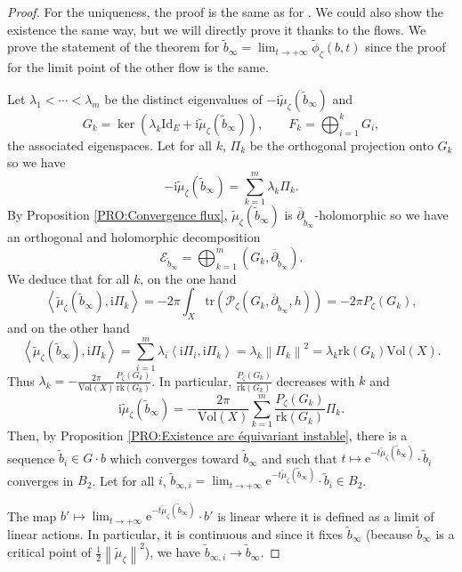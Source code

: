 \documentclass{article}
\theoremstyle{remark}
\theoremstyle{definition}
\newcommand{\rk}{\mathrm{rk}}
\newcommand{\tr}{\mathrm{tr}}
\newcommand{\Vol}{\mathrm{Vol}}
\newcommand{\Id}{\mathrm{Id}}
\renewcommand{\i}{\boldsymbol{\mathrm{i}}}
\newcommand{\e}{\boldsymbol{\mathrm{e}}}
\newcommand{\scal}[2]{\left< #1,#2 \right>}
\newcommand{\norme}[1]{\left\| #1 \right\|}
\newcommand{\E}{\mathcal{E}}
\newcommand{\mP}{\mathcal{P}}
\newcommand{\dbar}{\overline{\partial}}
\begin{document}
\begin{proof}
For the uniqueness, the proof is the same as for \cite[Theorem 1.3.4]{Huybrechts_Lehn}. We could also show the existence the same way, but we will directly prove it thanks to the flows. We prove the statement of the theorem for $\tilde{b}_\infty = \lim_{t \rightarrow +\infty} \tilde{\phi}_\zeta(b,t)$ since the proof for the limit point of the other flow is the same.

Let $\lambda_1 < \cdots < \lambda_m$ be the distinct eigenvalues of $-\i\tilde{\mu}_\zeta(\tilde{b}_\infty)$ and
$$
G_k = \ker(\lambda_k\Id_E + \i\tilde{\mu}_\zeta(\tilde{b}_\infty)), \qquad F_k = \bigoplus_{i = 1}^k G_i,
$$
the associated eigenspaces. Let for all $k$, $\Pi_k$ be the orthogonal projection onto $G_k$ so we have
$$
-\i\tilde{\mu}_\zeta(\tilde{b}_\infty) = \sum_{k = 1}^m \lambda_k\Pi_k.
$$
By Proposition \ref{PRO:Convergence flux}, $\tilde{\mu}_\zeta(\tilde{b}_\infty)$ is $\dbar_{\tilde{b}_\infty}$-holomorphic so we have an orthogonal and holomorphic decomposition
$$
\E_{\tilde{b}_\infty} = \bigoplus_{k = 1}^m (G_k,\dbar_{\tilde{b}_\infty}).
$$
We deduce that for all $k$, on the one hand
$$
\scal{\tilde{\mu}_\zeta(\tilde{b}_\infty)}{\i\Pi_k} = -2\pi\int_X \tr(\mP_\zeta(G_k,\dbar_{\tilde{b}_\infty},h)) = -2\pi P_\zeta(G_k),
$$
and on the other hand
$$
\scal{\tilde{\mu}_\zeta(\tilde{b}_\infty)}{\i\Pi_k} = \sum_{i = 1}^m \lambda_i\scal{\i\Pi_i}{\i\Pi_k} = \lambda_k\norme{\Pi_k}^2 = \lambda_k\rk(G_k)\Vol(X).
$$
Thus $\lambda_k = -\frac{2\pi}{\Vol(X)}\frac{P_\zeta(G_k)}{\rk(G_k)}$. In particular, $\frac{P_\zeta(G_k)}{\rk(G_k)}$ decreases with $k$ and
$$
\i\tilde{\mu}_\zeta(\tilde{b}_\infty) = -\frac{2\pi}{\Vol(X)}\sum_{k = 1}^m \frac{P_\zeta(G_k)}{\rk(G_k)}\Pi_k.
$$
Then, by Proposition \ref{PRO:Existence arc équivariant instable}, there is a sequence $\tilde{b}_i \in G \cdot b$ which converges toward $\tilde{b}_\infty$ and such that $t \mapsto \e^{-t\tilde{\mu}_\zeta(\tilde{b}_\infty)} \cdot \tilde{b}_i$ converges in $B_2$. Let for all $i$, $\tilde{b}_{\infty,i} = \lim_{t \rightarrow +\infty} \e^{-t\tilde{\mu}_\zeta(\tilde{b}_\infty)} \cdot \tilde{b}_i \in B_2$.

The map $b' \mapsto \lim_{t \rightarrow +\infty} \e^{-t\tilde{\mu}_\zeta(\tilde{b}_\infty)} \cdot b'$ is linear where it is defined as a limit of linear actions. In particular, it is continuous and since it fixes $\tilde{b}_\infty$ (because $\tilde{b}_\infty$ is a critical point of $\frac{1}{2}\norme{\tilde{\mu}_\zeta}^2$), we have $\tilde{b}_{\infty,i} \rightarrow \tilde{b}_\infty$.


\end{proof}
\end{document}
